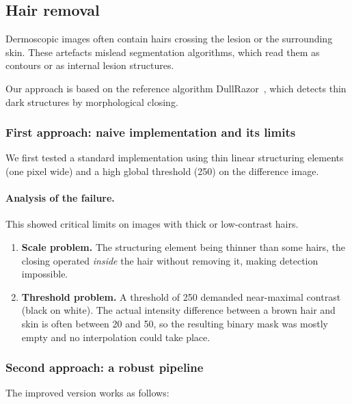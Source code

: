 \documentclass[11pt,a4paper]{article}
\begin{document}
\subsection{Hair removal}

Dermoscopic images often contain hairs crossing the lesion or the surrounding
skin. These artefacts mislead segmentation algorithms, which read them as
contours or as internal lesion structures.

Our approach is based on the reference algorithm DullRazor~\cite{dullrazor},
which detects thin dark structures by morphological closing.

\subsubsection{First approach: naive implementation and its limits}

We first tested a standard implementation using thin linear structuring elements
(one pixel wide) and a high global threshold (250) on the difference image.

\paragraph{Analysis of the failure.} This showed critical limits on images with
thick or low-contrast hairs.

\begin{enumerate}
  \item \textbf{Scale problem.} The structuring element being thinner than some
  hairs, the closing operated \emph{inside} the hair without removing it, making
  detection impossible.
  \item \textbf{Threshold problem.} A threshold of 250 demanded near-maximal
  contrast (black on white). The actual intensity difference between a brown
  hair and skin is often between 20 and 50, so the resulting binary mask was
  mostly empty and no interpolation could take place.
\end{enumerate}

\subsubsection{Second approach: a robust pipeline}
\label{sec:hair-pipeline}

The improved version works as follows:
\end{document}
